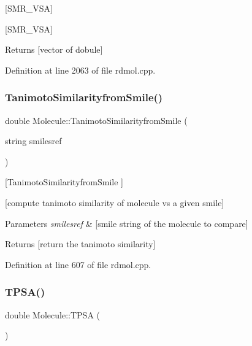 \mbox{[}S\+M\+R\+\_\+\+V\+SA\mbox{]} 

\mbox{[}S\+M\+R\+\_\+\+V\+SA\mbox{]}

\begin{DoxyReturn}{Returns}
\mbox{[}vector of dobule\mbox{]} 
\end{DoxyReturn}


Definition at line 2063 of file rdmol.\+cpp.

\mbox{\label{class_molecule_a2f83a282a6276fb330b46831a29907d6}} 
\subsubsection{\texorpdfstring{Tanimoto\+Similarityfrom\+Smile()}{TanimotoSimilarityfromSmile()}}
{\footnotesize\ttfamily double Molecule\+::\+Tanimoto\+Similarityfrom\+Smile (\begin{DoxyParamCaption}\item[{string}]{smilesref }\end{DoxyParamCaption})}



\mbox{[}Tanimoto\+Similarityfrom\+Smile \mbox{]} 

\mbox{[}compute tanimoto similarity of molecule vs a given smile\mbox{]}


\begin{DoxyParams}{Parameters}
{\em smilesref} & \mbox{[}smile string of the molecule to compare\mbox{]} \\
\hline
\end{DoxyParams}
\begin{DoxyReturn}{Returns}
\mbox{[}return the tanimoto similarity\mbox{]} 
\end{DoxyReturn}


Definition at line 607 of file rdmol.\+cpp.

\mbox{\label{class_molecule_ac5e52f33289342df7147a7151890df95}} 
\subsubsection{\texorpdfstring{T\+P\+S\+A()}{TPSA()}}
{\footnotesize\ttfamily double Molecule\+::\+T\+P\+SA (\begin{DoxyParamCaption}{ }\end{DoxyParamCaption})}




